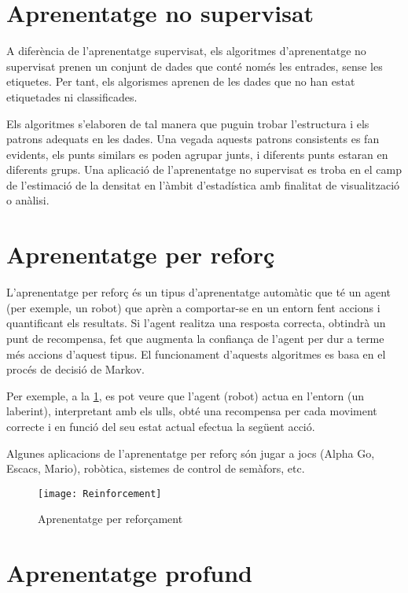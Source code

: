 \begin{refsection}
	\section{Aprenentatge no supervisat}
	
	A diferència de l’aprenentatge supervisat, els algoritmes d'aprenentatge no supervisat prenen un conjunt de dades que conté només les entrades, sense les etiquetes. Per tant, els algorismes aprenen de les dades que no han estat etiquetades ni classificades.\supercite{mlwiki}
	
	Els algoritmes s'elaboren de tal manera que puguin trobar l'estructura i els patrons adequats en les dades. Una vegada aquests patrons consistents es fan evidents, els punts  similars es poden agrupar junts, i diferents punts estaran en diferents grups. Una aplicació de l’aprenentatge no supervisat es troba en el camp de l’estimació de la densitat en l'àmbit d'estadística amb finalitat de visualització o anàlisi.\supercite{DataCamp}
	
	\section{Aprenentatge per reforç}
	
	L'aprenentatge per reforç és un tipus d’aprenentatge automàtic que té un agent (per exemple, un robot) que aprèn a comportar-se en un entorn fent accions i quantificant els resultats. Si l'agent realitza una resposta correcta, obtindrà un punt de recompensa, fet que augmenta la confiança de l'agent per dur a terme més accions d'aquest tipus. El funcionament d'aquests algoritmes es basa en el procés de decisió de Markov.\supercite{mlwiki,TDSmarkov}
	
	Per exemple, a la \cref{fig:rein}, es pot veure que l’agent (robot) actua en l’entorn (un laberint), interpretant amb els ulls, obté una recompensa per cada moviment correcte i en funció del seu estat actual efectua la següent acció.
	
	Algunes aplicacions de l'aprenentatge per reforç són jugar a jocs (Alpha Go, Escacs, Mario), robòtica, sistemes de control de semàfors, etc.
	
	\begin{figure}[H]
		\centering
		\texttt{[image: Reinforcement]}
		\caption{Aprenentatge per reforçament}
		\label{fig:rein}
	\end{figure}
	
	\section{Aprenentatge profund}
	

\end{refsection}
